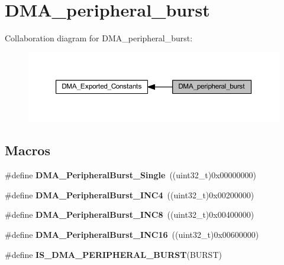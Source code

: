 \hypertarget{group___d_m_a__peripheral__burst}{}\section{D\+M\+A\+\_\+peripheral\+\_\+burst}
\label{group___d_m_a__peripheral__burst}
Collaboration diagram for D\+M\+A\+\_\+peripheral\+\_\+burst\+:\nopagebreak
\begin{figure}[H]
\begin{center}
\leavevmode
\includegraphics[width=350pt]{group___d_m_a__peripheral__burst}
\end{center}
\end{figure}
\subsection*{Macros}
\begin{DoxyCompactItemize}
\item 
\mbox{\label{group___d_m_a__peripheral__burst_ga524cdc5efb8978b586637f35e38a850b}} 
\#define {\bfseries D\+M\+A\+\_\+\+Peripheral\+Burst\+\_\+\+Single}~((uint32\+\_\+t)0x00000000)
\item 
\mbox{\label{group___d_m_a__peripheral__burst_gaa8eba5161b3927f1ffb81157f3e39b71}} 
\#define {\bfseries D\+M\+A\+\_\+\+Peripheral\+Burst\+\_\+\+I\+N\+C4}~((uint32\+\_\+t)0x00200000)
\item 
\mbox{\label{group___d_m_a__peripheral__burst_gaf04ba122268e0f54085ca8e45410fe69}} 
\#define {\bfseries D\+M\+A\+\_\+\+Peripheral\+Burst\+\_\+\+I\+N\+C8}~((uint32\+\_\+t)0x00400000)
\item 
\mbox{\label{group___d_m_a__peripheral__burst_ga04ff56ff0a2a5470fc2c4817be4213c2}} 
\#define {\bfseries D\+M\+A\+\_\+\+Peripheral\+Burst\+\_\+\+I\+N\+C16}~((uint32\+\_\+t)0x00600000)
\item 
\#define {\bfseries I\+S\+\_\+\+D\+M\+A\+\_\+\+P\+E\+R\+I\+P\+H\+E\+R\+A\+L\+\_\+\+B\+U\+R\+ST}(B\+U\+R\+ST)
\end{DoxyCompactItemize}


